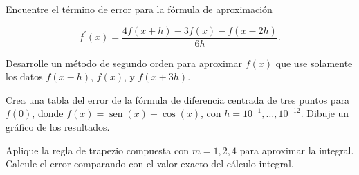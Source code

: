 \begin{questions}
    \question

    Encuentre el término de error para la fórmula de aproximación

    \begin{equation*}
        f^{\prime}\left(x\right)=
        \frac{4f\left(x+h\right)-3f\left(x\right)-f\left(x-2h\right)}{6h}.
    \end{equation*}

    \question

    Desarrolle un método de segundo orden para aproximar $f\left(x\right)$
    que use solamente los datos $f\left(x-h\right)$, $f\left(x\right)$, y $f\left(x+3h\right)$.

    \question

    Crea una tabla del error de la fórmula de diferencia centrada de
    tres puntos para $f\left(0\right)$, donde
    $f\left(x\right)=\operatorname{sen}\left(x\right)-\cos\left(x\right)$,
    con $h=10^{-1},\dotsc,10^{-12}$.
    Dibuje un gráfico de los resultados.

    \question

    Aplique la regla de trapezio compuesta con $m=1,2,4$ para aproximar la integral.
    Calcule el error comparando con el valor exacto del cálculo integral.

    \begin{multicols}{3}

    \end{multicols}


\end{questions}
